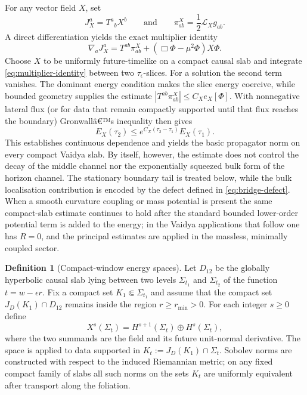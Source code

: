 \documentclass[11pt,a4paper]{article}
\theoremstyle{definition}
\newtheorem{definition}[theorem]{Definition}
\theoremstyle{remark}
\begin{document}
	For any vector field \(X\), set
	\[
	J_X^a=T^a{}_b X^b
	\qquad\text{and}\qquad
	\pi^X_{ab}=\frac12\mathcal{L}_X g_{ab}.
	\]
	A direct differentiation yields the exact multiplier identity
	\begin{equation}
		\nabla_a J_X^a
		=T^{ab}\pi^X_{ab}+(\Box\Phi-\mu^2\Phi)X\Phi.
		\label{eq:multiplier-identity}
	\end{equation}
	Choose \(X\) to be uniformly future-timelike on a compact causal slab and integrate \eqref{eq:multiplier-identity} between two \(\tau_\epsilon\)-slices. For a solution the second term vanishes. The dominant energy condition makes the slice energy coercive, while bounded geometry supplies the estimate \(|T^{ab}\pi^X_{ab}|\leq C_X e_X[\Phi]\). With nonnegative lateral flux (or for data that remain compactly supported until that flux reaches the boundary) Gronwallâ€™s inequality then gives
	\begin{equation}
		E_X(\tau_2)
		\leq e^{C_X(\tau_2-\tau_1)}E_X(\tau_1).
		\label{eq:first-energy-estimate}
	\end{equation}
	This establishes continuous dependence and yields the basic propagator norm on every compact Vaidya slab. By itself, however, the estimate does not control the decay of the middle channel nor the exponentially squeezed bulk form of the horizon channel. The stationary boundary tail is treated below, while the bulk localisation contribution is encoded by the defect defined in \eqref{eq:bridge-defect}. When a smooth curvature coupling or mass potential is present the same compact-slab estimate continues to hold after the standard bounded lower-order potential term is added to the energy; in the Vaidya applications that follow one has \(R=0\), and the principal estimates are applied in the massless, minimally coupled sector.
	
	\begin{definition}[Compact-window energy spaces]
		\label{def:energy-spaces}
		Let \(D_{12}\) be the globally hyperbolic causal slab lying between two levels \(\Sigma_{t_1}\) and \(\Sigma_{t_2}\) of the function \(t=w-\epsilon r\). Fix a compact set \(K_1\Subset\Sigma_{t_1}\) and assume that the compact set \(J_D(K_1)\cap D_{12}\) remains inside the region \(r\geq r_{\min}>0\). For each integer \(s\geq0\) define
		\begin{equation}
			X^s(\Sigma_t)=H^{s+1}(\Sigma_t)\oplus H^s(\Sigma_t),
			\label{eq:concrete-Xs}
		\end{equation}
		where the two summands are the field and its future unit-normal derivative. The space is applied to data supported in \(K_t:=J_D(K_1)\cap\Sigma_t\). Sobolev norms are constructed with respect to the induced Riemannian metric; on any fixed compact family of slabs all such norms on the sets \(K_t\) are uniformly equivalent after transport along the foliation.
	\end{definition}
	
\end{document}
